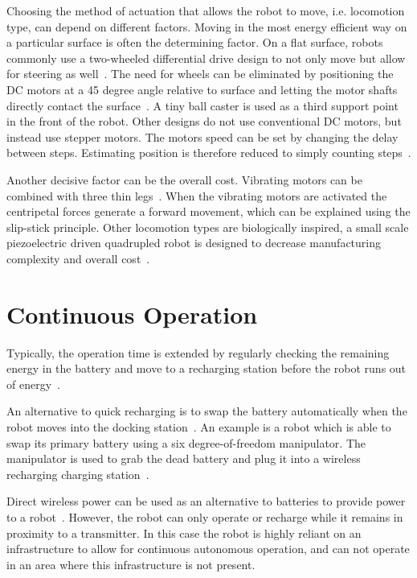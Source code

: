 Choosing the method of actuation that allows the robot to move, i.e. locomotion type, can depend on different factors.
Moving in the most energy efficient way on a particular surface is often the determining factor.
On a flat surface, robots commonly use a two-wheeled differential drive design to not only move but allow for steering as well~\cite{sabelhaus_icra_2013, pickem_icra_2015}.
The need for wheels can be eliminated by positioning the DC motors at a 45 degree angle relative to surface and letting the motor shafts directly contact the surface~\cite{kim_iros_2016}.
A tiny ball caster is used as a third support point in the front of the robot.
Other designs do not use conventional DC motors, but instead use stepper motors.
The motors speed can be set by changing the delay between steps. 
Estimating position is therefore reduced to simply counting steps~\cite{pickem_icra_2015}.

Another decisive factor can be the overall cost.
Vibrating motors can be combined with three thin legs~\cite{rubenstein_icra_2012}.
When the vibrating motors are activated the centripetal forces generate a forward movement, which can be explained using the slip-stick principle.
Other locomotion types are biologically inspired, a small scale piezoelectric driven quadrupled robot is designed to decrease manufacturing complexity and overall cost~\cite{baisch_iros_2013}.

\section{Continuous Operation}
\label{sec:rw_continous_operation}

Typically, the operation time is extended by regularly checking the remaining energy in the battery and move to a recharging station before the robot runs out of energy~\cite{pickem_icra_2015, rubenstein_icra_2012}.

An alternative to quick recharging is to swap the battery automatically when the robot moves into the docking station~\cite{kemal_mech_2015}.
An example is a robot which is able to swap its primary battery using a six degree-of-freedom manipulator.
The manipulator is used to grab the dead battery and plug it into a wireless recharging charging station~\cite{zhang_conel_2013}.

Direct wireless power can be used as an alternative to batteries to provide power to a robot~\cite{karpelson_icra_2014}.
However, the robot can only operate or recharge while it remains in proximity to a transmitter. 
In this case the robot is highly reliant on an infrastructure to allow for continuous autonomous operation, and can not operate in an area where this infrastructure is not present.
 
